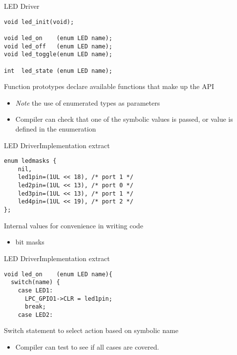 \documentclass[svgnames,x11names]{beamer}
\begin{document}
\begin{frame}[fragile]{LED Driver}{}
\begin{verbatim}
void led_init(void);

void led_on    (enum LED name);
void led_off   (enum LED name);
void led_toggle(enum LED name);

int  led_state (enum LED name);
\end{verbatim}

\alert{Function prototypes} declare available functions that make up the
  API
\begin{itemize}
\item \emph{Note} the use of enumerated types as parameters
\item Compiler can check that one of the symbolic values is passed, or
  value is defined in the enumeration
\end{itemize}
\end{frame}

\begin{frame}[fragile]{LED Driver}{Implementation extract}
  \begin{verbatim}
enum ledmasks {
	nil,
	led1pin=(1UL << 18), /* port 1 */
	led2pin=(1UL << 13), /* port 0 */
	led3pin=(1UL << 13), /* port 1 */
	led4pin=(1UL << 19), /* port 2 */
};
\end{verbatim}

Internal values for convenience in writing code
\begin{itemize}
\item bit masks
\end{itemize}
\end{frame}

\begin{frame}[fragile]{LED Driver}{Implementation extract}
  \begin{verbatim}
void led_on    (enum LED name){
  switch(name) {
    case LED1:
      LPC_GPIO1->CLR = led1pin;
      break;
    case LED2:
\end{verbatim}

Switch statement to select action based on symbolic name
\begin{itemize}
\item Compiler can test to see if all cases are covered.
\end{itemize}
\end{frame}
\end{document}
